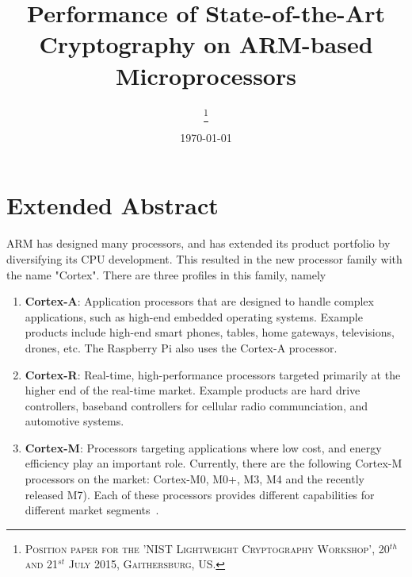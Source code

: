 \documentclass[peerreview, a4paper, draft, 7pt]{IEEEtran}
\begin{document}
\title{Performance of State-of-the-Art Cryptography on ARM-based Microprocessors}

\author{
\thanks{\textsc{Position paper for the 'NIST Lightweight Cryptography Workshop', 20$^{th}$ and 21$^{st}$ July 2015, Gaithersburg, US.}}
}

\date{\today}

\maketitle


\section{Extended Abstract}


ARM has designed many processors, and has extended its product portfolio by diversifying its CPU development. This resulted in the new processor family with the name "Cortex". There are three profiles in this family, namely 

\begin{enumerate}
  \item \textbf{Cortex-A}: Application processors that are designed to handle complex applications, such as high-end embedded operating systems. Example products include high-end smart phones, tables, home gateways, televisions, drones, etc. The Raspberry Pi also uses the Cortex-A processor. 
   
  \item \textbf{Cortex-R}: Real-time, high-performance processors targeted primarily at the higher end of the real-time market. Example products are hard drive controllers, baseband controllers for cellular radio communciation, and automotive systems. 
  
  \item \textbf{Cortex-M}: Processors targeting applications where low cost, and energy efficiency play an important role. Currently, there are the following Cortex-M processors on the market: Cortex-M0, M0+, M3, M4 and the recently released M7). Each of these processors provides different capabilities for different market segments~\cite{Cortex-M}. 
  
\end{enumerate}
\end{document}

